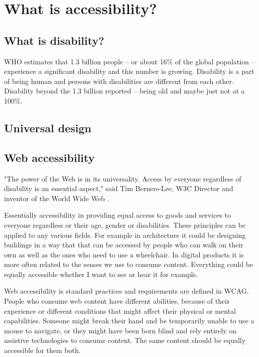 \documentclass{master_thesis_section}
\begin{document}
\section{What is accessibility?}

\subsection{What is disability?}
WHO estimates that 1.3 billion people – or about 16\% of the global population – experience a significant disability and this number is growing. Disability is a part of being human and persons with disabilities are different from each other. \citep{WHODisability2022} \\
Disability beyond the 1.3 billion reported – being old and maybe just not at a 100\%. \citep{}

\subsection{Universal design}
\subsection{Web accessibility}

"The power of the Web is in its universality. Access by everyone regardless of disability is an essential aspect," said Tim Berners-Lee, W3C Director and inventor of the World Wide Web \citep{worldwidewebconsortium1997}.

Essentially accessibility in providing equal access to goods and services to everyone regardless or their age, gender or disabilities. These principles can be applied to any various fields. For example in architecture it could be designing buildings in a way that that can be accessed by people who can walk on their own as well as the ones who need to use a wheelchair. In digital products it is more often related to the senses we use to consume content. Everything could be equally accessible whether I want to see or hear it for example.

Web accessibility is standard practices and requirements are defined in WCAG. People who consume web content have different abilities, because of their experience or different conditions that might affect their physical or mental capabilities. Someone might break their hand and be temporarily unable to use a mouse to navigate, or they might have been born blind and rely entirely on assistive technologies to consume content. The same content should be equally accessible for them both.
\end{document}
